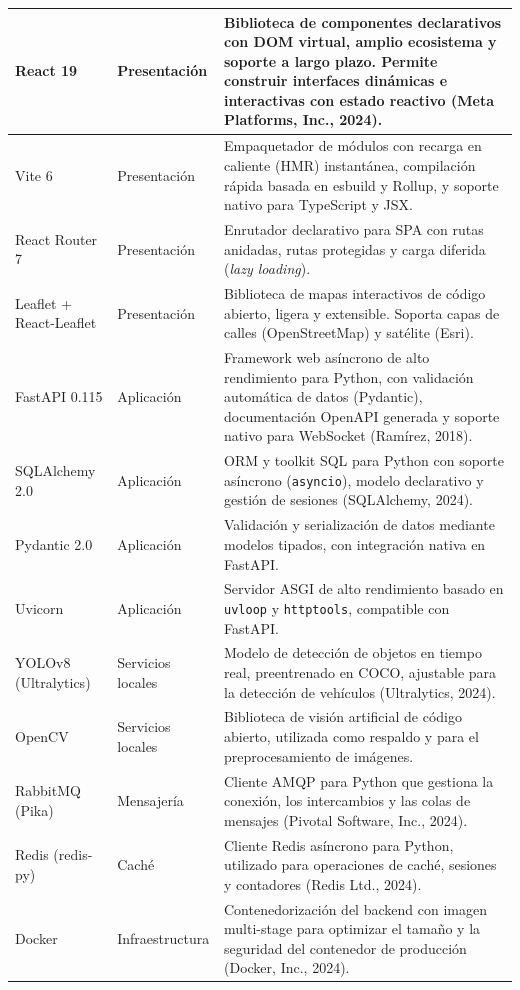 \begin{longtable}{p{3cm} p{2cm} p{9cm}}
React 19 & Presentación & Biblioteca de componentes declarativos con DOM virtual, amplio ecosistema y soporte a largo plazo. Permite construir interfaces dinámicas e interactivas con estado reactivo (Meta Platforms, Inc., 2024). \\
\midrule
Vite 6 & Presentación & Empaquetador de módulos con recarga en caliente (HMR) instantánea, compilación rápida basada en esbuild y Rollup, y soporte nativo para TypeScript y JSX. \\
\midrule
React Router 7 & Presentación & Enrutador declarativo para SPA con rutas anidadas, rutas protegidas y carga diferida (\textit{lazy loading}). \\
\midrule
Leaflet + React-Leaflet & Presentación & Biblioteca de mapas interactivos de código abierto, ligera y extensible. Soporta capas de calles (OpenStreetMap) y satélite (Esri). \\
\midrule
FastAPI 0.115 & Aplicación & Framework web asíncrono de alto rendimiento para Python, con validación automática de datos (Pydantic), documentación OpenAPI generada y soporte nativo para WebSocket (Ramírez, 2018). \\
\midrule
SQLAlchemy 2.0 & Aplicación & ORM y toolkit SQL para Python con soporte asíncrono (\texttt{asyncio}), modelo declarativo y gestión de sesiones (SQLAlchemy, 2024). \\
\midrule
Pydantic 2.0 & Aplicación & Validación y serialización de datos mediante modelos tipados, con integración nativa en FastAPI. \\
\midrule
Uvicorn & Aplicación & Servidor ASGI de alto rendimiento basado en \texttt{uvloop} y \texttt{httptools}, compatible con FastAPI. \\
\midrule
YOLOv8 (Ultralytics) & Servicios locales & Modelo de detección de objetos en tiempo real, preentrenado en COCO, ajustable para la detección de vehículos (Ultralytics, 2024). \\
\midrule
OpenCV & Servicios locales & Biblioteca de visión artificial de código abierto, utilizada como respaldo y para el preprocesamiento de imágenes. \\
\midrule
RabbitMQ (Pika) & Mensajería & Cliente AMQP para Python que gestiona la conexión, los intercambios y las colas de mensajes (Pivotal Software, Inc., 2024). \\
\midrule
Redis (redis-py) & Caché & Cliente Redis asíncrono para Python, utilizado para operaciones de caché, sesiones y contadores (Redis Ltd., 2024). \\
\midrule
Docker & Infraestructura & Contenedorización del backend con imagen multi-stage para optimizar el tamaño y la seguridad del contenedor de producción (Docker, Inc., 2024). \\
\end{longtable}

